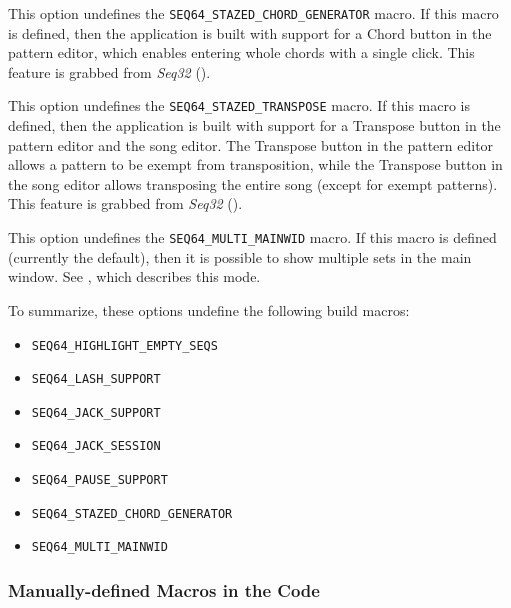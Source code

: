         This option undefines the \texttt{SEQ64\_STAZED\_CHORD\_GENERATOR}
        macro.  If this macro is defined,
        then the application is built with support for a Chord button in the
        pattern editor, which enables entering whole chords with a single
        click.  This feature is grabbed from \textsl{Seq32} (\cite{seq32}).

        This option undefines the \texttt{SEQ64\_STAZED\_TRANSPOSE}
        macro.  If this macro is defined,
        then the application is built with support for a Transpose button in the
        pattern editor and the song editor.  The Transpose button in the
        pattern editor allows a pattern to be exempt from transposition,
        while the Transpose button in the song editor allows transposing the
        entire song (except for exempt patterns).
        This feature is grabbed from \textsl{Seq32} (\cite{seq32}).

        This option undefines the \texttt{SEQ64\_MULTI\_MAINWID} macro.
        If this macro is defined (currently the default), then it is
        possible to show multiple sets in the main window.
        See ,
        which describes this mode.

    To summarize, these options undefine the following build macros:

      \begin{itemize}
        \item \texttt{SEQ64\_HIGHLIGHT\_EMPTY\_SEQS}
        \item \texttt{SEQ64\_LASH\_SUPPORT}
        \item \texttt{SEQ64\_JACK\_SUPPORT}
        \item \texttt{SEQ64\_JACK\_SESSION}
        \item \texttt{SEQ64\_PAUSE\_SUPPORT}
        \item \texttt{SEQ64\_STAZED\_CHORD\_GENERATOR}
        \item \texttt{SEQ64\_MULTI\_MAINWID}
      \end{itemize}

\subsubsection{Manually-defined Macros in the Code}
\label{subsubsec:seq64_build_macros}

